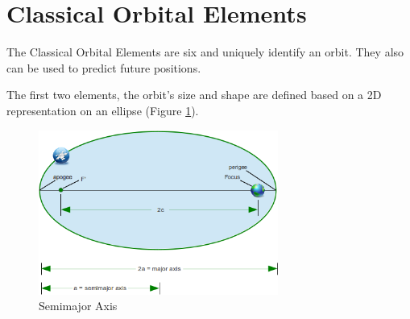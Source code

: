 \section{Classical Orbital Elements}\label{2.2}
The Classical Orbital Elements are six and uniquely identify an orbit. They also can be used to predict future positions.\cite{IntAstr}

The first two elements, the orbit's size and shape are defined based on a 2D representation on an ellipse (Figure \ref{f2.1}).

\begin{figure}[H]
\centerline{\includegraphics[width=0.7\textwidth]{images/Ellipse.png}}
\caption{Semimajor Axis}
\label{f2.1}
\end{figure}


